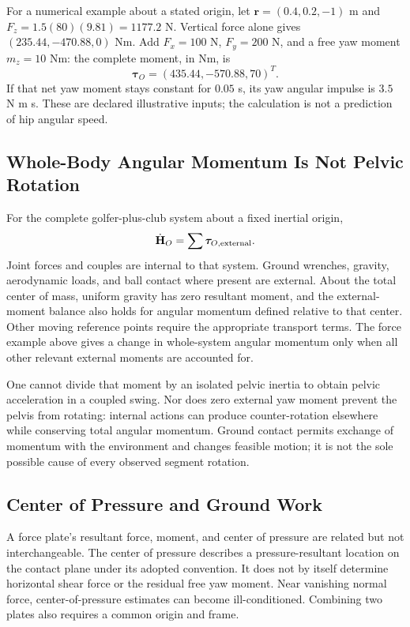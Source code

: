 For a numerical example about a stated origin, let $\mathbf r=(0.4,0.2,-1)$ m and $F_z=1.5(80)(9.81)=1177.2$ N. Vertical force alone gives $(235.44,-470.88,0)$ Nm. Add $F_x=100$ N, $F_y=200$ N, and a free yaw moment $m_z=10$ Nm: the complete moment, in Nm, is
\begin{equation}
\boldsymbol\tau_O=(435.44,-570.88,70)^T.
\end{equation} If that net yaw moment stays constant for $0.05$ s, its yaw angular impulse is $3.5$ N m s. These are declared illustrative inputs; the calculation is not a prediction of hip angular speed.

\subsection{Whole-Body Angular Momentum Is Not Pelvic Rotation}
For the complete golfer-plus-club system about a fixed inertial origin,
\begin{equation}
\dot{\mathbf H}_O=\sum\boldsymbol\tau_{O,\rm external}.
\end{equation}
Joint forces and couples are internal to that system. Ground wrenches, gravity, aerodynamic loads, and ball contact where present are external. About the total center of mass, uniform gravity has zero resultant moment, and the external-moment balance also holds for angular momentum defined relative to that center. Other moving reference points require the appropriate transport terms. The force example above gives a change in whole-system angular momentum only when all other relevant external moments are accounted for.

One cannot divide that moment by an isolated pelvic inertia to obtain pelvic acceleration in a coupled swing. Nor does zero external yaw moment prevent the pelvis from rotating: internal actions can produce counter-rotation elsewhere while conserving total angular momentum. Ground contact permits exchange of momentum with the environment and changes feasible motion; it is not the sole possible cause of every observed segment rotation.

\subsection{Center of Pressure and Ground Work}
A force plate's resultant force, moment, and center of pressure are related but not interchangeable. The center of pressure describes a pressure-resultant location on the contact plane under its adopted convention. It does not by itself determine horizontal shear force or the residual free yaw moment. Near vanishing normal force, center-of-pressure estimates can become ill-conditioned. Combining two plates also requires a common origin and frame.

